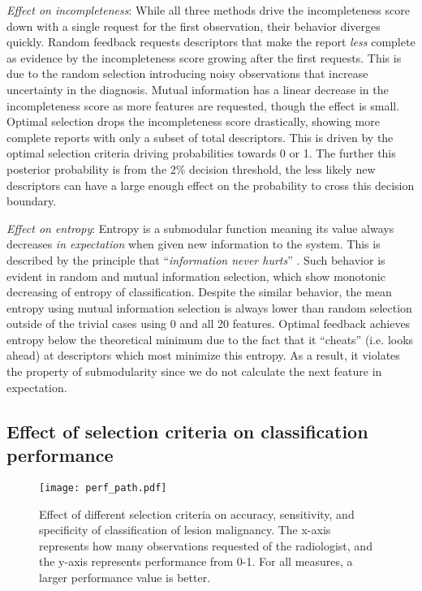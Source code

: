 \emph{Effect on incompleteness}:
While all three methods drive the incompleteness score down with a single request for the first observation, their behavior diverges quickly.
Random feedback requests descriptors that make the report \emph{less} complete as evidence by the incompleteness score growing after the first requests.
This is due to the random selection introducing noisy observations that increase uncertainty in the diagnosis.
Mutual information has a linear decrease in the incompleteness score as more features are requested, though the effect is small.
Optimal selection drops the incompleteness score drastically, showing more complete reports with only a subset of total descriptors.
This is driven by the optimal selection criteria driving probabilities towards 0 or 1.
The further this posterior probability is from the 2\% decision threshold, the less likely new descriptors can have a large enough effect on the probability to cross this decision boundary.

\emph{Effect on entropy}:
Entropy is a submodular function meaning its value always decreases \emph{in expectation} when given new information to the system.
This is described by the principle that ``\emph{information never hurts}'' \cite{Nemhauser:1978ck,Krause:2005tr}.
Such behavior is evident in random and mutual information selection, which show monotonic decreasing of entropy of classification.
Despite the similar behavior, the mean entropy using mutual information selection is always lower than random selection outside of the trivial cases using 0 and all 20 features.
Optimal feedback achieves entropy below the theoretical minimum due to the fact that it ``cheats'' (i.e. looks ahead) at descriptors which most minimize this entropy.
As a result, it violates the property of submodularity since we do not calculate the next feature in expectation.


 \subsection{Effect of selection criteria on classification performance}
 \begin{figure}[h]
 	\centering
 	\texttt{[image: perf\_path.pdf]}
 	\caption[Effect of selection criteria on classification performance]{Effect of different selection criteria on accuracy, sensitivity, and specificity of classification of lesion malignancy. The x-axis represents how many observations requested of the radiologist, and the y-axis represents performance from 0-1. For all measures, a larger performance value is better.}
 	\label{fig:feedback_performance}
 \end{figure}

